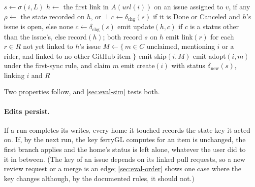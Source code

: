 \documentclass[11pt,a4paper]{article}
\newcommand{\ferry}{ferryGL}
\newcommand{\key}[1]{\texttt{#1}}
\newcommand{\status}[1]{\textsf{#1}}
\newcommand{\action}[1]{\textsf{#1}}
\begin{document}
\begin{algorithm}[t]
  \caption{Planning one item $i$, with its linked pull requests $L$ and riders $R$
    (\cref{sec:riders}). $A(u)$ are the links to URL $u$ returned by Linear, $C$ the user's
    issues in the route's team, and $v$ the user.}
  \label{alg:plan}
  \small
  \begin{algorithmic}[1]
    \State $s \gets \sigma(i, L)$
    \State $h \gets$ the first link in $A(\mathit{url}(i))$ on an issue assigned to $v$, if any
      \State $\rho \gets$ the state recorded on $h$, or $\bot$
        \If{$\rho = \bot$} 
          \State $c \gets \delta_{\text{chg}}(s)$ if it is \status{Done} or \status{Canceled}
            and $h$'s issue is open, else none
        \Else
          \State $c \gets \delta_{\text{chg}}(s)$ \Comment{none for \key{issue:open:pr\_merged}}
        \EndIf
        \State emit \action{update}$(h, c)$ if $c$ is a status other than the issue's, else
          \action{record}$(h)$; both record $s$ on $h$
      \EndIf
      \State emit \action{link}$(r)$ for each $r \in R$ not yet linked to $h$'s issue
    \Else
      \State $M \gets \{\, m \in C$ unclaimed, mentioning $i$ or a rider, and linked to no other
        GitHub item $\}$
        \State emit \action{skip}$(i, M)$ 
        \State emit \action{adopt}$(i, m)$ under the first-sync rule, and claim $m$
      \Else
        \State emit \action{create}$(i)$ with status $\delta_{\text{new}}(s)$, linking $i$ and $R$
      \EndIf
    \EndIf
  \end{algorithmic}
\end{algorithm}

Two properties follow, and \cref{sec:eval-sim} tests both.

\paragraph{Edits persist.} If a run completes its writes, every home it touched records the
state key it acted on. If, by the next run, the key \ferry{} computes for an item is unchanged,
the first branch applies and the home's status is left alone, whatever the user did to it in
between. (The key of an issue depends on its linked pull requests, so a new review request or a
merge is an edge; \cref{sec:eval-order} shows one case where the key changes although, by the
documented rules, it should not.)
\end{document}
